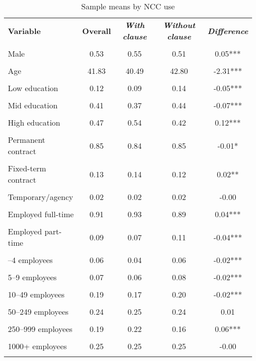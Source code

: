 \begin{table}[!ht]\centering
\caption{Sample means by NCC use}
\label{tab:sample_means_ncc} %
\begin{tabular}{lcccc}\toprule
\textbf{Variable} & \textbf{Overall} & \textbf{\textit{With clause}} & \textbf{\textit{Without clause}} & \textbf{\textit{Difference}} \\\\ \midrule
Male & 0.53 & 0.55 & 0.51 & 0.05*** \\\\
Age & 41.83 & 40.49 & 42.80 & -2.31*** \\\\
\addlinespace
Low education & 0.12 & 0.09 & 0.14 & -0.05*** \\\\
Mid education & 0.41 & 0.37 & 0.44 & -0.07*** \\\\
High education & 0.47 & 0.54 & 0.42 & 0.12*** \\\\
\addlinespace
Permanent contract & 0.85 & 0.84 & 0.85 & -0.01* \\\\
Fixed-term contract & 0.13 & 0.14 & 0.12 & 0.02** \\\\
Temporary/agency & 0.02 & 0.02 & 0.02 & -0.00 \\\\
\addlinespace
Employed full-time & 0.91 & 0.93 & 0.89 & 0.04*** \\\\
Employed part-time & 0.09 & 0.07 & 0.11 & -0.04*** \\\\
\addlinespace
1–4 employees & 0.06 & 0.04 & 0.06 & -0.02*** \\\\
5–9 employees & 0.07 & 0.06 & 0.08 & -0.02*** \\\\
10–49 employees & 0.19 & 0.17 & 0.20 & -0.02*** \\\\
50–249 employees & 0.24 & 0.25 & 0.24 & 0.01 \\\\
250–999 employees & 0.19 & 0.22 & 0.16 & 0.06*** \\\\
1000+ employees & 0.25 & 0.25 & 0.25 & -0.00 \\\\
\bottomrule\end{tabular}\end{table}
